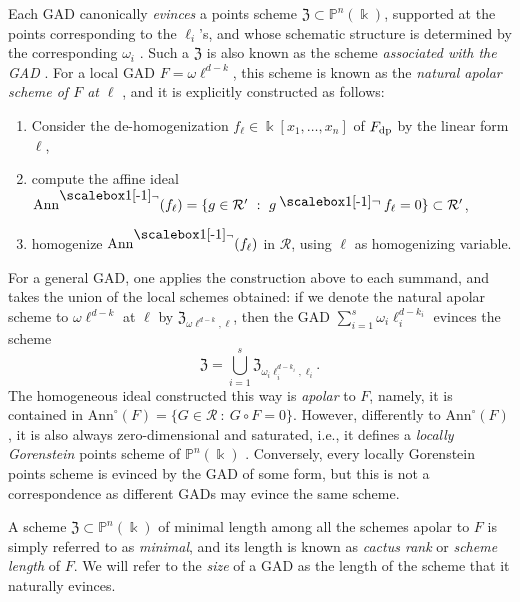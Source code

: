 \documentclass{amsart}
\theoremstyle{plain}
\renewcommand{\k}{\Bbbk}
\renewcommand{\S}{\mathcal{S}}
\newcommand{\Ann}{\textnormal{Ann}}
\renewcommand{\P}{\mathbb{P}}
\def\a{\alpha}
\def\b{\beta}
\newcommand{\contract}{\mathbin{\mathpalette\dointprod\relax}}
\newcommand{\dointprod}[2]{%
  \raisebox{\depth}{\scalebox{1}[-1]{$#1\lnot$}}}
\def\\k{{\mathsf{k}}}
\def\P{{\mathbb{P}}}
\def\R{\mathcal{R}}
\def\Z{\mathfrak{Z}}
\def\Ann{\mathrm{Ann}}
\numberwithin{equation}{section}
\begin{document}
Each GAD canonically \emph{evinces} a points scheme $\Z \subset \P^n(\k)$, supported at the points corresponding to the $\ell_i$'s, and whose schematic structure is determined by the corresponding $\omega_i$ \cite{BOT24}.
Such a $\Z$ is also known as the scheme \emph{associated with the GAD} \cite{BMT25}.
For a local GAD $F = \omega \ell^{d-k}$, this scheme is known as the \emph{natural apolar scheme of $F$ at $\ell$} \cite{BJMR18}, and it is explicitly constructed as follows: 
\begin{enumerate}
    \item Consider the de-homogenization $f_{\ell} \in \k[x_1, \dots,x_n]$ of $F_{\rm dp}$ by the linear form $\ell$,
    \item compute the affine ideal $\Ann^{\contract}( f_{\ell} ) = \{ g \in \R' \ : \ g \contract f_{\ell} = 0 \} \subset \R'$, %
    \item homogenize $\Ann^{\contract}( f_{\ell} )$ in $\R$, using $\ell$ as homogenizing variable. 
\end{enumerate}
For a general GAD, one applies the construction above to each summand, and takes the union of the local schemes obtained: if we denote the natural apolar scheme to $\omega \ell^{d-k}$ at $\ell$ by $\Z_{\omega \ell^{d-k}, \ell}$, then the GAD $\sum_{i=1}^s \omega_i \ell_i^{d-k_i}$ evinces the scheme 
\[\Z=\bigcup_{i=1}^s \Z_{\omega_i \ell_i^{d-k_i}, \ell_i}.\]
The homogeneous ideal constructed this way is \emph{apolar} to $F$, namely, it is contained in $\Ann^\circ(F) = \{G \in \R \ : \ G \circ F = 0\}$.
However, differently to $\Ann^\circ(F)$, it is also always zero-dimensional and saturated, i.e., it defines a \emph{locally Gorenstein} points scheme of $\P^n(\k)$ \cite[§6.4]{IK99}.
Conversely, every locally Gorenstein points scheme is evinced by the GAD of some form, but this is not a correspondence as different GADs may evince the same scheme.

A scheme $\Z \subset \P^n(\k)$ of minimal length among all the schemes apolar to $F$ is simply referred to as \emph{minimal}, and its length is known as \emph{cactus rank} \cite{BB14} or \emph{scheme length} \cite{IK99} of $F$.
We will refer to the \emph{size} of a GAD as the length of the scheme that it naturally evinces. 
\end{document}
